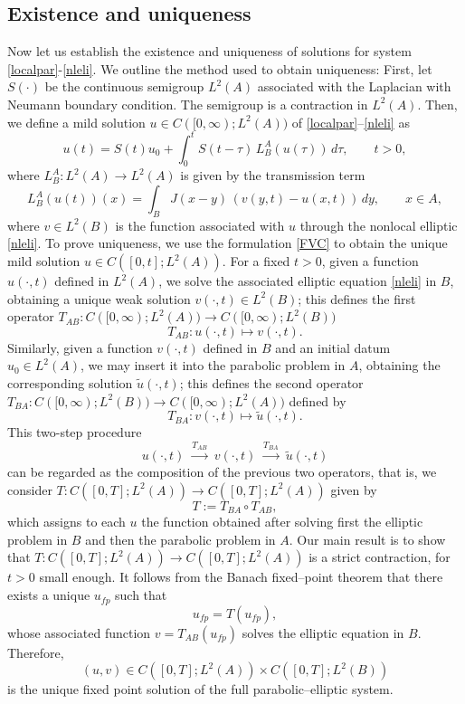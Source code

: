 \documentclass[reqno]{amsart}
\numberwithin{equation}{section}
\begin{document}
\subsection{Existence and uniqueness}

Now let us establish the existence and uniqueness of solutions for system \eqref{localpar}-\eqref{nleli}. We outline the method used to obtain uniqueness:
First, let $S(\cdot)$ be the continuous semigroup $L^2(A)$ associated with the Laplacian with Neumann boundary condition. The semigroup is a contraction in $L^2(A)$. Then, we define a mild solution  $u\in C([0,\infty);L^2(A))$ of \eqref{localpar}--\eqref{nleli} as
\begin{equation}\label{FVC}
u(t) = S(t)u_0 + \int_0^t S(t-\tau)\,L_B^A(u(\tau))\,d\tau, \qquad t>0,
\end{equation}
where $L_B^A:L^2(A)\to L^2(A)$ is given by the transmission term
\[ L_B^A(u(t))(x) = \int_B J(x-y)\,(v(y,t)-u(x,t))\,dy,\qquad x\in A, \]
where $v\in L^2(B)$ is the function associated with $u$ through the nonlocal elliptic \eqref{nleli}. To prove uniqueness, we use the formulation \eqref{FVC} to obtain the unique mild solution $u\in C([0,t];L^2(A))$. For a fixed $t>0$, given a function $u(\cdot,t)$ defined in $L^2(A)$, we solve the associated elliptic equation \eqref{nleli} in $B$, obtaining a unique weak solution $v(\cdot,t)\in L^2(B)$; this defines the first operator $T_{AB}:C([0,\infty);L^2(A))\to C([0,\infty);L^2(B))$
\[
T_{AB} : u(\cdot,t) \longmapsto v(\cdot,t).
\]
Similarly, given a function $v(\cdot,t)$ defined in $B$ and an initial datum $u_0\in L^2(A)$, we may insert it into the
parabolic problem in $A$, obtaining the corresponding solution $\tilde{u}(\cdot,t)$; this defines
the second operator $T_{BA}:C([0,\infty);L^2(B))\to C([0,\infty);L^2(A))$ defined by
\[
T_{BA} : v(\cdot,t) \longmapsto \tilde{u} (\cdot,t).
\]
This two-step procedure
\[
u(\cdot,t) \;\xrightarrow{T_{AB}}\; v(\cdot,t) \;\xrightarrow{T_{BA}}\; \tilde{u}(\cdot,t)
\]
can be regarded as the composition of the previous two operators, that is, we consider $T : C([0,T];L^2(A))\longrightarrow C([0,T];L^2(A))$ given by
$$T := T_{BA}\circ T_{AB},$$
which assigns to each $u$ the function obtained after solving first the
elliptic problem in $B$ and then the parabolic problem in $A$. Our main result is to show that $T : C([0,T];L^2(A))\longrightarrow C([0,T];L^2(A))$ is a strict contraction, for $t>0$ small enough. It follows from the Banach fixed--point theorem that there exists a unique $u_{fp}$ such that
$$u_{fp} = T(u_{fp}),$$
whose associated function $v=T_{AB}(u_{fp})$ solves the elliptic equation in $B$.
Therefore,
$$(u,v)\in C([0,T];L^2(A))\times C([0,T];L^2(B))$$
is the unique fixed point solution of the full parabolic--elliptic system. 
\end{document}
